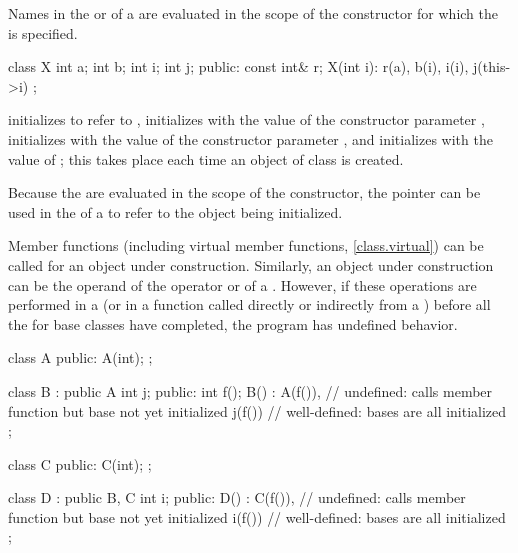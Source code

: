 \pnum
{}%
Names in the
or 
of a
are evaluated in the scope of the constructor for which the
is specified.
\begin{example}
\begin{codeblock}
class X {
  int a;
  int b;
  int i;
  int j;
public:
  const int& r;
  X(int i): r(a), b(i), i(i), j(this->i) { }
};
\end{codeblock}

initializes
to refer to
,
initializes
with the value of the constructor parameter
,
initializes
with the value of the constructor parameter
,
and initializes
with the value of
;
this takes place each time an object of class
is created.
\end{example}
\begin{note}
Because the
are evaluated in the scope of the constructor, the
pointer can be used in the
of a
to refer to the object being initialized.
\end{note}

\pnum
{}%
Member functions (including virtual member functions, \ref{class.virtual}) can be
called for an object under construction.
Similarly, an object under construction can be the operand of the
operator or of a
.
However, if these operations are performed in a
(or in a function called directly or indirectly from a
)
before all the
for base classes have completed, the program has undefined behavior.
\begin{example}
\begin{codeblock}
class A {
public:
  A(int);
};

class B : public A {
  int j;
public:
  int f();
  B() : A(f()),     // undefined: calls member function but base  not yet initialized
  j(f()) { }        // well-defined: bases are all initialized
};

class C {
public:
  C(int);
};

class D : public B, C {
  int i;
public:
  D() : C(f()),     // undefined: calls member function but base  not yet initialized
  i(f()) { }        // well-defined: bases are all initialized
};
\end{codeblock}
\end{example}

